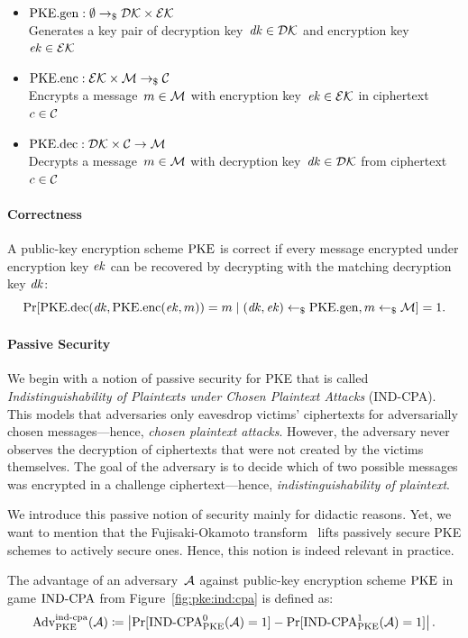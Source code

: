 \begin{itemize}
    \item $\mathrm{PKE}.\mathrm{gen}: \emptyset \to_\$ \mathcal{DK}\times\mathcal{EK}$\\ 
    Generates a key pair of decryption key~$\mathit{dk}\in\mathcal{DK}$ and encryption key~$\mathit{ek}\in\mathcal{EK}$
    \item $\mathrm{PKE}.\mathrm{enc}: \mathcal{EK}\times\mathcal{M} \to_\$ \mathcal{C}$\\
    Encrypts a message~$m\in\mathcal{M}$ with encryption key~$\mathit{ek}\in\mathcal{EK}$ in ciphertext~$c\in\mathcal{C}$
    \item $\mathrm{PKE}.\mathrm{dec}: \mathcal{DK}\times\mathcal{C} \to \mathcal{M}$\\
    Decrypts a message~$m\in\mathcal{M}$ with decryption key~$\mathit{dk}\in\mathcal{DK}$ from ciphertext~$c\in\mathcal{C}$
\end{itemize}

\paragraph{Correctness}
A public-key encryption scheme $\mathrm{PKE}$ is correct if every message encrypted under encryption key $\mathit{ek}$ can be recovered by decrypting with the matching decryption key $\mathit{dk}$:
\[
\Pr[\mathrm{PKE}.\mathrm{dec}(\mathit{dk},\mathrm{PKE}.\mathrm{enc}(\mathit{ek},m))=m\mid (\mathit{dk},\mathit{ek})\gets_\$\mathrm{PKE}.\mathrm{gen},m\gets_\$\mathcal{M}]=1\text{.}
\]

\paragraph{Passive Security}
We begin with a notion of passive security for PKE that is called \emph{Indistinguishability of Plaintexts under Chosen Plaintext Attacks} (IND-CPA).
This models that adversaries only eavesdrop victims' ciphertexts for adversarially chosen messages---hence, \emph{chosen plaintext attacks}.
However, the adversary never observes the decryption of ciphertexts that were not created by the victims themselves.
The goal of the adversary is to decide which of two possible messages was encrypted in a challenge ciphertext---hence, \emph{indistinguishability of plaintext}.

We introduce this passive notion of security mainly for didactic reasons.
Yet, we want to mention that the Fujisaki-Okamoto transform~\cite{C:FujOka99} lifts passively secure PKE schemes to actively secure ones.
Hence, this notion is indeed relevant in practice.

The advantage of an adversary~$\mathcal{A}$ against public-key encryption scheme $\mathrm{PKE}$ in game ${\mathrm{IND}\text{-}\mathrm{CPA}}$ from Figure~\ref{fig:pke:ind:cpa} is defined as:
\[
\mathrm{Adv}_{\mathrm{PKE}}^{\mathrm{ind}\text{-}\mathrm{cpa}}(\mathcal{A})\coloneqq\left|\Pr[{\mathrm{IND}\text{-}\mathrm{CPA}}_{\mathrm{PKE}}^0(\mathcal{A})=1]-\Pr[{\mathrm{IND}\text{-}\mathrm{CPA}}_{\mathrm{PKE}}^1(\mathcal{A})=1]\right|\text{.}
\]

